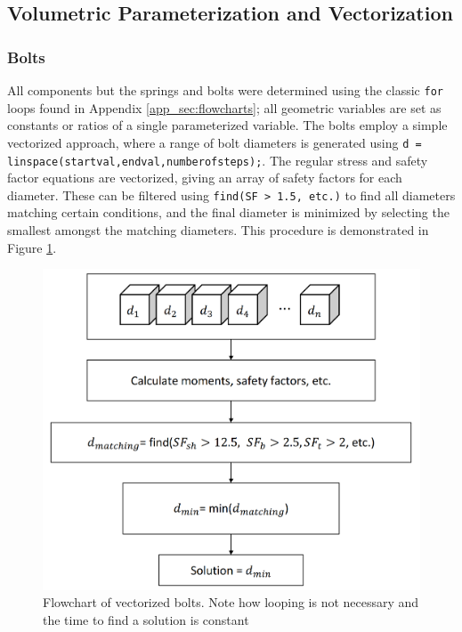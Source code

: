 \subsection{Volumetric Parameterization and Vectorization} \label{app_sub:vectorization}

\subsubsection{Bolts} \label{app_ssub:vectorization_bolt}

All components but the springs and bolts were determined using the classic \texttt{for} loops found in Appendix \ref{app_sec:flowcharts}; all geometric variables are set as constants or ratios of a single parameterized variable.
The bolts employ a simple vectorized approach, where a range of bolt diameters is generated using \texttt{d = linspace(startval,endval,numberofsteps);}.
The regular stress and safety factor equations are vectorized, giving an array of safety factors for each diameter.
These can be filtered using \texttt{find(SF > 1.5, etc.)} to find all diameters matching certain conditions, and the final diameter is minimized by selecting the smallest amongst the matching diameters.
This procedure is demonstrated in Figure \ref{fig:vectorized_bolts}.

\begin{figure}[H]
    \centering
    \includegraphics[width=\textwidth]{3_Parametrization/img/VectorizedBolts.png}
    \caption{Flowchart of vectorized bolts. Note how looping is not necessary and the time to find a solution is constant}
    \label{fig:vectorized_bolts}
\end{figure}{}

